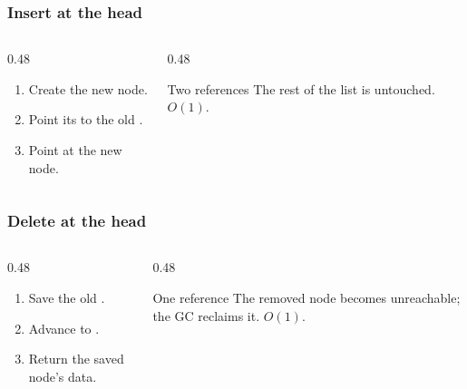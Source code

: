 \documentclass[aspectratio=169,10pt,compress]{beamer}
\begin{document}
\begin{frame}[t,fragile] \frametitle{Insert at the head}
  \begin{columns}[T]
    \begin{column}{0.48\textwidth}
      \begin{enumerate}\small
        \item Create the new node.
        \item Point its  to the old .
        \item Point  at the new node.
      \end{enumerate}
    \end{column}
    \begin{column}{0.48\textwidth}
      \begin{block}{Two references}
        \small
        The rest of the list is untouched. $O(1)$.
      \end{block}
    \end{column}
  \end{columns}
\end{frame}




\begin{frame}[t,fragile] \frametitle{Delete at the head}
  \begin{columns}[T]
    \begin{column}{0.48\textwidth}
      \begin{enumerate}\small
        \item Save the old .
        \item Advance  to .
        \item Return the saved node's data.
      \end{enumerate}
    \end{column}
    \begin{column}{0.48\textwidth}
      \begin{block}{One reference}
        \small
        The removed node becomes unreachable; the GC reclaims it. $O(1)$.
      \end{block}
    \end{column}
  \end{columns}
\end{frame}
\end{document}
